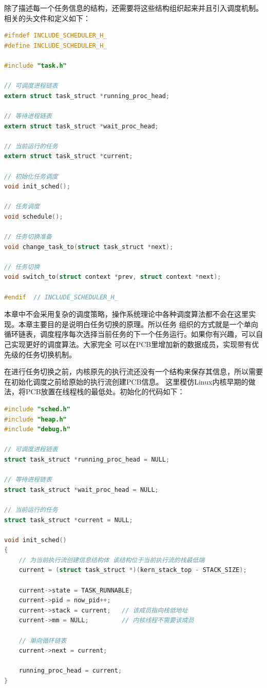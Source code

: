 \par 除了描述每一个任务信息的结构，还需要将这些结构组织起来并且引入调度机制。相关的头文件和定义如下：

\begin{lstlisting}[language = C, caption = include/sched.h]
#ifndef INCLUDE_SCHEDULER_H_
#define INCLUDE_SCHEDULER_H_

#include "task.h"

// 可调度进程链表
extern struct task_struct *running_proc_head;

// 等待进程链表
extern struct task_struct *wait_proc_head;

// 当前运行的任务
extern struct task_struct *current;

// 初始化任务调度
void init_sched();

// 任务调度
void schedule();

// 任务切换准备
void change_task_to(struct task_struct *next);

// 任务切换
void switch_to(struct context *prev, struct context *next);

#endif 	// INCLUDE_SCHEDULER_H_
\end{lstlisting}

\par 本章中不会采用复杂的调度策略，操作系统理论中各种调度算法都不会在这里实现。本章主要目的是说明白任务切换的原理。所以任务\allowbreak
组织的方式就是一个单向循环链表，调度程序每次选择当前任务的下一个任务运行。如果你有兴趣，可以自己实现更好的调度算法。大家完全\allowbreak
可以在PCB里增加新的数据成员，实现带有优先级的任务切换机制。

\par 在进行任务切换之前，内核原先的执行流还没有一个结构来保存其信息，所以需要在初始化调度之前给原始的执行流创建PCB信息。\allowbreak
这里模仿Linux内核早期的做法，将PCB放置在线程栈的最低处。初始化的代码如下：

\begin{lstlisting}[language = C, caption = kernel/sched/sched.c]
#include "sched.h"
#include "heap.h"
#include "debug.h"

// 可调度进程链表
struct task_struct *running_proc_head = NULL;

// 等待进程链表
struct task_struct *wait_proc_head = NULL;

// 当前运行的任务
struct task_struct *current = NULL;

void init_sched()
{
	// 为当前执行流创建信息结构体 该结构位于当前执行流的栈最低端
	current = (struct task_struct *)(kern_stack_top - STACK_SIZE);

	current->state = TASK_RUNNABLE;
	current->pid = now_pid++;
	current->stack = current; 	// 该成员指向栈低地址
	current->mm = NULL; 		// 内核线程不需要该成员

	// 单向循环链表
	current->next = current;

	running_proc_head = current;
}
\end{lstlisting}

